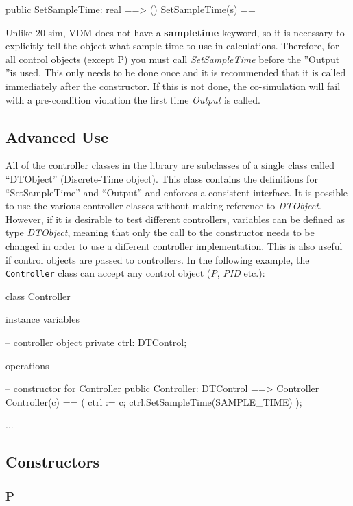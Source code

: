 \documentclass{crescendorepchap}
\begin{document}
\begin{vdmrt}
public SetSampleTime: real ==> ()
SetSampleTime(s) ==
\end{vdmrt}

Unlike 20-sim, VDM does not have a \textbf{sampletime} keyword, so it is
necessary to explicitly tell the object what sample time to use in
calculations. Therefore, for all control objects (except P) you must
call \emph{SetSampleTime} before the ''Output ''is used. This only needs
to be done once and it is recommended that it is called immediately
after the constructor. If this is not done, the co-simulation will fail
with a pre-condition violation the first time \emph{Output} is called.

\subsection{Advanced Use}

All of the controller classes in the library are subclasses of a single
class called ``DTObject'' (Discrete-Time object). This class contains
the definitions for ``SetSampleTime'' and ``Output'' and enforces a
consistent interface. It is possible to use the various controller
classes without making reference to \emph{DTObject}. However, if it is
desirable to test different controllers, variables can be defined as
type \emph{DTObject}, meaning that only the call to the constructor
needs to be changed in order to use a different controller
implementation. This is also useful if control objects are passed to
controllers. In the following example, the \texttt{Controller} class can
accept any control object (\emph{P}, \emph{PID} etc.):

\begin{vdmrt}
class Controller

instance variables

-- controller object
private ctrl: DTControl;

operations

-- constructor for Controller
public Controller: DTControl ==> Controller
Controller(c) ==
(
ctrl := c;
ctrl.SetSampleTime(SAMPLE_TIME)
);

...
\end{vdmrt}

\subsection{Constructors}

\subsubsection{P}
\end{document}

